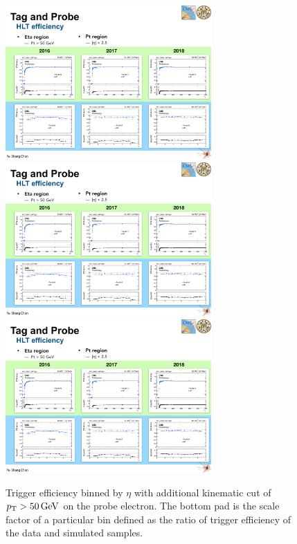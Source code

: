 \begin{figure}\centering
    \includegraphics[width=0.7\textwidth]{figure/appendix_16eta.pdf}
    \includegraphics[width=0.7\textwidth]{figure/appendix_17eta.pdf}
    \includegraphics[width=0.7\textwidth]{figure/appendix_18eta.pdf}
    \caption[Trigger efficiency binned by $\eta$]
    {
        Trigger efficiency binned by $\eta$ with additional kinematic cut of $p_{\mathrm{T}}>50\,\text{Ge\hspace{-.08em}V}$ on the probe electron.
        The bottom pad is the scale factor of a particular bin defined as the ratio of trigger efficiency of the data and simulated samples.
    }
    \label{fig:appendix_etaeff}
\end{figure}

